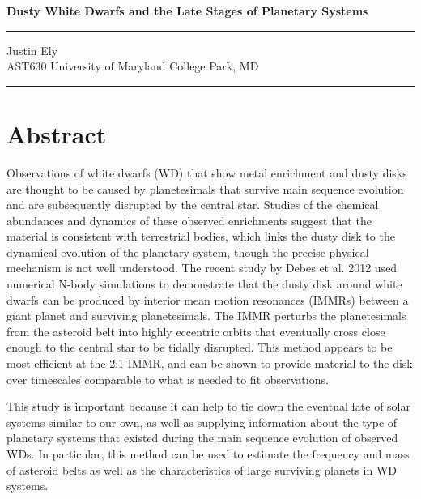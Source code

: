 \documentclass[a4paper,11pt]{article}
\begin{document}
\begin{flushright}

\vspace{1.1cm}

{\bf\large Dusty White Dwarfs and the Late Stages of Planetary Systems}

\rule{0.25\linewidth}{0.5pt}

\vspace{0.1cm}
Justin Ely \\
\vspace{0.1cm}
\footnotesize{AST630 University of Maryland College Park, MD\\}
\vspace{0.1cm}
\end{flushright}

\noindent\rule{\linewidth}{1.0pt}
\section*{Abstract}
Observations of white dwarfs (WD) that show metal enrichment and dusty disks are thought to
be caused by planetesimals that survive main sequence evolution and are subsequently 
disrupted by the central star. 
Studies of the chemical abundances and 
dynamics of these observed enrichments suggest that the material is consistent with 
terrestrial bodies, which links the dusty disk to the dynamical evolution of the 
planetary system, though the precise physical mechanism is not well understood.  
The recent study by Debes et al. 2012 used numerical N-body simulations to 
demonstrate that the dusty disk around white dwarfs can be produced by 
interior mean motion resonances (IMMRs) between a giant planet and surviving planetesimals.  The IMMR 
perturbs the planetesimals from the asteroid belt into highly eccentric orbits 
that eventually cross close enough to the central star to be tidally disrupted. 
This method appears to be most efficient at the 2:1 IMMR, and can be shown
to provide material to the disk over timescales comparable to what is needed
to fit observations.

This study is important because it can help to tie down the eventual fate of 
solar systems similar to our own, as well as supplying information about the 
type of planetary systems that existed during the main sequence evolution of 
observed WDs.  
In particular, this method can be used to estimate the frequency and mass of 
asteroid belts as well as the characteristics of large surviving planets in WD
systems.
\end{document}
